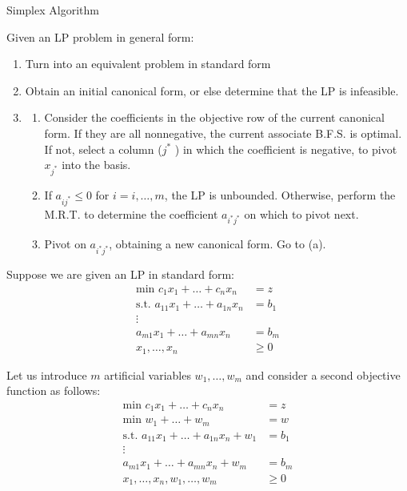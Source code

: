 \documentclass{article}
\begin{document}
\begin{definition}{Simplex Algorithm}

    Given an LP problem in general form:
    \begin{enumerate}
        \item Turn into an equivalent problem in standard form
        \item Obtain an initial canonical form, or else determine that the LP is infeasible. 
        \item \begin{enumerate}
            \item Consider the coefficients in the objective row of the current canonical form. If they are all nonnegative, 
            the current associate B.F.S. is optimal. If not, select a column (\(j^*\) ) in which 
            the coefficient is negative, to pivot \(x_{j^*}\) into the basis.
            \item If \(a_{ij^*}\leq0\) for \(i=i,\dots,m\), the LP is unbounded. Otherwise, 
            perform the M.R.T. to determine the coefficient \(a_{i^*j^*}\) on which to pivot next.
            \item Pivot on \(a_{i^*j^*}\), obtaining a new canonical form. Go to (a).    
        \end{enumerate}
    \end{enumerate}
\end{definition}

Suppose we are given an LP in standard form: \\
\begin{align}
    \text{min }c_1x_1+\dots+c_n x_n &=z \\
    \text{s.t. }a_{11}x_1+\dots+a_{1n}x_n&=b_1 \\
    \vdots \\
    a_{m1}x_1+\dots+a_{mn}x_n&=b_m \\
    x_{1},\dots, x_ n & \geq0
\end{align}

Let us introduce \(m\) artificial variables \(w_1,\dots,w_m\) and consider a second 
objective function as follows: \\
\begin{align}
    \text{min }c_1x_1+\dots+c_n x_n &=z \\
    \text{min }w_1+\dots+w_m &=w \\
    \text{s.t. }a_{11}x_1+\dots+a_{1n}x_n+w_1&=b_1 \\
    \vdots \\
    a_{m1}x_1+\dots+a_{mn}x_n+w_m&=b_m \\
    x_{1},\dots,x_ n, w_1, \dots, w_m & \geq0
\end{align}
\end{document}
